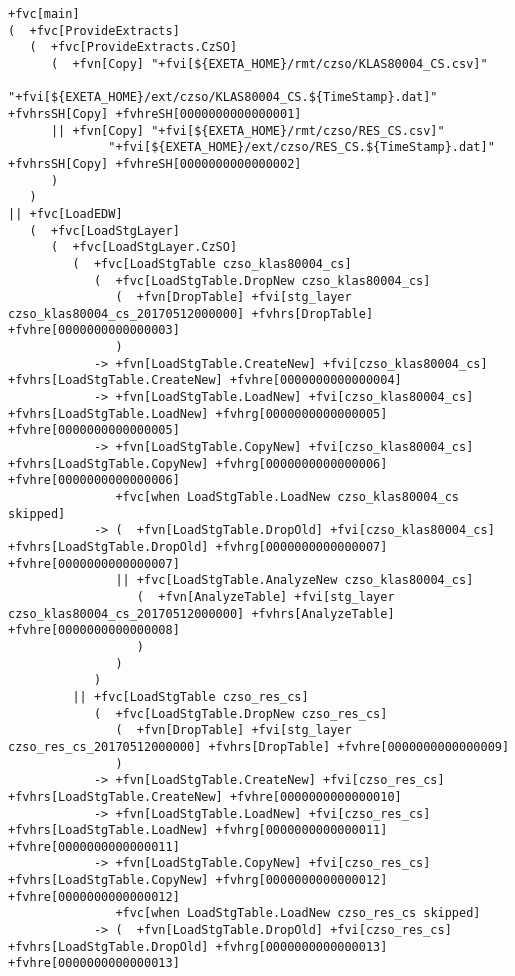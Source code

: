 \documentclass[a4paper,12pt,english,oneside]{book}
\begin{document}
\begin{landscape}
\begin{Verbatim}[commandchars=+\[\]]
+fvc[main]
(  +fvc[ProvideExtracts]
   (  +fvc[ProvideExtracts.CzSO]
      (  +fvn[Copy] "+fvi[${EXETA_HOME}/rmt/czso/KLAS80004_CS.csv]"
              "+fvi[${EXETA_HOME}/ext/czso/KLAS80004_CS.${TimeStamp}.dat]" +fvhrsSH[Copy] +fvhreSH[0000000000000001]
      || +fvn[Copy] "+fvi[${EXETA_HOME}/rmt/czso/RES_CS.csv]"
              "+fvi[${EXETA_HOME}/ext/czso/RES_CS.${TimeStamp}.dat]" +fvhrsSH[Copy] +fvhreSH[0000000000000002]
      )
   )
|| +fvc[LoadEDW]
   (  +fvc[LoadStgLayer]
      (  +fvc[LoadStgLayer.CzSO]
         (  +fvc[LoadStgTable czso_klas80004_cs]
            (  +fvc[LoadStgTable.DropNew czso_klas80004_cs]
               (  +fvn[DropTable] +fvi[stg_layer czso_klas80004_cs_20170512000000] +fvhrs[DropTable] +fvhre[0000000000000003]
               )
            -> +fvn[LoadStgTable.CreateNew] +fvi[czso_klas80004_cs] +fvhrs[LoadStgTable.CreateNew] +fvhre[0000000000000004]
            -> +fvn[LoadStgTable.LoadNew] +fvi[czso_klas80004_cs] +fvhrs[LoadStgTable.LoadNew] +fvhrg[0000000000000005] +fvhre[0000000000000005]
            -> +fvn[LoadStgTable.CopyNew] +fvi[czso_klas80004_cs] +fvhrs[LoadStgTable.CopyNew] +fvhrg[0000000000000006] +fvhre[0000000000000006]
               +fvc[when LoadStgTable.LoadNew czso_klas80004_cs skipped]
            -> (  +fvn[LoadStgTable.DropOld] +fvi[czso_klas80004_cs] +fvhrs[LoadStgTable.DropOld] +fvhrg[0000000000000007] +fvhre[0000000000000007]
               || +fvc[LoadStgTable.AnalyzeNew czso_klas80004_cs]
                  (  +fvn[AnalyzeTable] +fvi[stg_layer czso_klas80004_cs_20170512000000] +fvhrs[AnalyzeTable] +fvhre[0000000000000008]
                  )
               )  
            )  
         || +fvc[LoadStgTable czso_res_cs]
            (  +fvc[LoadStgTable.DropNew czso_res_cs]
               (  +fvn[DropTable] +fvi[stg_layer czso_res_cs_20170512000000] +fvhrs[DropTable] +fvhre[0000000000000009]
               )
            -> +fvn[LoadStgTable.CreateNew] +fvi[czso_res_cs] +fvhrs[LoadStgTable.CreateNew] +fvhre[0000000000000010]
            -> +fvn[LoadStgTable.LoadNew] +fvi[czso_res_cs] +fvhrs[LoadStgTable.LoadNew] +fvhrg[0000000000000011] +fvhre[0000000000000011]
            -> +fvn[LoadStgTable.CopyNew] +fvi[czso_res_cs] +fvhrs[LoadStgTable.CopyNew] +fvhrg[0000000000000012] +fvhre[0000000000000012]
               +fvc[when LoadStgTable.LoadNew czso_res_cs skipped]
            -> (  +fvn[LoadStgTable.DropOld] +fvi[czso_res_cs] +fvhrs[LoadStgTable.DropOld] +fvhrg[0000000000000013] +fvhre[0000000000000013]

\end{Verbatim}
\end{landscape}
\end{document}
